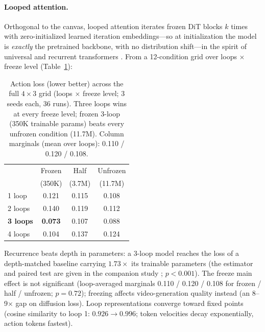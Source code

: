 \documentclass[10pt,twocolumn]{article}
\begin{document}
\paragraph{Looped attention.} Orthogonal to the canvas, looped attention iterates frozen DiT blocks $k$ times with zero-initialized learned iteration embeddings---so at initialization the model is \emph{exactly} the pretrained backbone, with no distribution shift---in the spirit of universal and recurrent transformers \cite{dehghani2019universal,schwarzschild2021thinking}. From a 12-condition grid over loops $\times$ freeze level (Table~\ref{tab:loops}):

\begin{table}[h]
\centering
\small
\caption{Action loss (lower better) across the full $4\times3$ grid (loops $\times$ freeze level; 3 seeds each, 36 runs). Three loops wins at every freeze level; frozen 3-loop (350K trainable params) beats every unfrozen condition (11.7M). Column marginals (mean over loops): 0.110 / 0.120 / 0.108.}
\label{tab:loops}
\begin{tabular}{@{}lccc@{}}
\toprule
 & Frozen & Half & Unfrozen \\
 & (350K) & (3.7M) & (11.7M) \\
\midrule
1 loop  & 0.121 & 0.115 & 0.108 \\
2 loops & 0.140 & 0.119 & 0.112 \\
\textbf{3 loops} & \textbf{0.073} & 0.107 & 0.088 \\
4 loops & 0.104 & 0.137 & 0.124 \\
\bottomrule
\end{tabular}
\end{table}

Recurrence beats depth in parameters: a 3-loop model reaches the loss of a depth-matched baseline carrying $\mathbf{1.73\times}$ its trainable parameters (the estimator and paired test are given in the companion study \cite{valdez2026looped}; $p<0.001$). The freeze main effect is not significant (loop-averaged marginals 0.110 / 0.120 / 0.108 for frozen / half / unfrozen; $p=0.72$); freezing affects video-generation quality instead (an 8--9$\times$ gap on diffusion loss). Loop representations converge toward fixed points (cosine similarity to loop 1: $0.926\rightarrow0.996$; token velocities decay exponentially, action tokens fastest).
\end{document}
